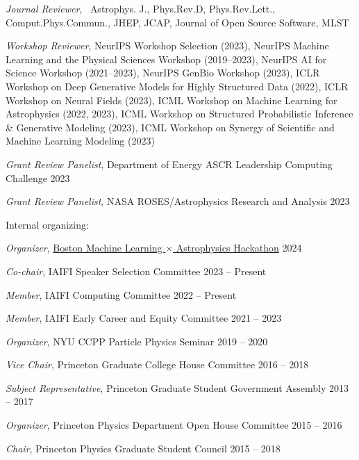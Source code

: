 \documentclass[letterpaper,11pt]{article}
\newenvironment{packed_itemize}{
\begin{itemize}[label=\raisebox{0.25ex}{\tiny$\bullet$}]
  \setlength{\itemsep}{4.2pt}
  \setlength{\parskip}{0pt}
  \setlength{\parsep}{0pt}}{\end{itemize}
}
\begin{document}
  \begin{packed_itemize}
  \item \emph{Journal Reviewer}, \ \scriptsize{Astrophys. J., Phys.Rev.{D}, Phys.Rev.Lett., Comput.Phys.Commun., JHEP,  JCAP, Journal of Open Source Software, MLST}\normalsize
  \item \emph{Workshop Reviewer}, \scriptsize{NeurIPS Workshop Selection (2023), NeurIPS Machine Learning and the Physical Sciences Workshop (2019--2023), NeurIPS AI for Science Workshop (2021--2023), NeurIPS GenBio Workshop (2023), ICLR Workshop on Deep Generative Models for Highly Structured Data (2022), ICLR Workshop on Neural Fields (2023), ICML Workshop on Machine Learning for Astrophysics (2022, 2023), ICML Workshop on Structured Probabilistic Inference \& Generative Modeling (2023), ICML Workshop on Synergy of Scientific and Machine Learning Modeling (2023)}\normalsize
  \item \emph{Grant Review Panelist}, Department of Energy ASCR Leadership Computing Challenge \hfill 2023
  \item \emph{Grant Review Panelist}, NASA ROSES/Astrophysics Research and Analysis \hfill 2023
  \end{packed_itemize}
  \noindent
Internal organizing:
  \begin{packed_itemize}
  \item \emph{Organizer}, \href{https://iaifi.org/hackathon.html}{Boston Machine Learning $\times$ Astrophysics Hackathon}  \hfill 2024
  \item \emph{Co-chair}, IAIFI Speaker Selection Committee  \hfill 2023 -- Present
  \item \emph{Member}, IAIFI Computing Committee  \hfill 2022 -- Present
  \item \emph{Member}, IAIFI Early Career and Equity Committee  \hfill 2021 -- 2023
  \item \emph{Organizer}, NYU CCPP Particle Physics Seminar \hfill 2019 -- 2020
  \item \emph{Vice Chair}, Princeton Graduate College House Committee \hfill 2016 -- 2018
  \item \emph{Subject Representative}, Princeton Graduate Student Government Assembly \hfill 2013 -- 2017
  \item \emph{Organizer}, Princeton Physics Department Open House Committee  \hfill 2015 -- 2016
  \item \emph{Chair}, Princeton Physics Graduate Student Council \hfill 2015 -- 2018
\end{packed_itemize}
\vspace{2.0mm}
\end{document}
